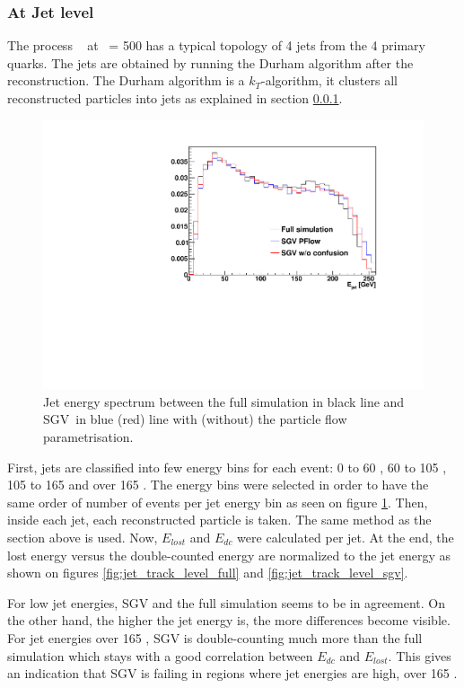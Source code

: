 \subsubsection{At Jet level}

The process \ee \ra\ \WWqqqq{} at \rts\ = 500 \GeV has a typical topology of 4 jets from the 4 primary quarks. The jets are obtained by running the Durham algorithm after the reconstruction. The Durham algorithm is a $k_T$-algorithm, it clusters all reconstructed particles into jets as explained in section \ref{}.

\begin{figure}[htbp!]
  \centering
  \includegraphics[width=1\linewidth]{../Thesis_Plots/SGV/Plots/Jet_spectrum.pdf}
  \caption{Jet energy spectrum between the full simulation in black line and SGV in blue (red) line with (without) the particle flow parametrisation.}
  \label{fig:jet_spectrum}
\end{figure}

First, jets are classified into few energy bins for each event: 0 to 60 \GeV, 60 to 105 \GeV, 105 to 165 \GeV and over 165 \GeV. The energy bins were selected in order to have the same order of number of events per jet energy bin as seen on figure \ref{fig:jet_spectrum}. Then, inside each jet, each reconstructed particle is taken. The same method as the section above is used. Now, $E_{lost}$ and $E_{dc}$ were calculated per jet. At the end, the lost energy versus the double-counted energy are normalized to the jet energy as shown on figures \ref{fig:jet_track_level_full} and \ref{fig:jet_track_level_sgv}.

For low jet energies, SGV and the full simulation seems to be in agreement. On the other hand, the higher the jet energy is, the more differences become visible. For jet energies over 165 \GeV, SGV is double-counting much more than the full simulation which stays with a good correlation between $E_{dc}$ and $E_{lost}$. This gives an indication that SGV is failing in regions where jet energies are high, over 165 \GeV.

